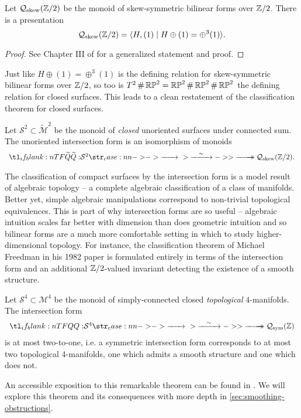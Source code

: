 \begin{proposition}
	Let $\mathcal{Q}_{\mathrm{skew}}(\mathbb{Z}/2)$ be the monoid of skew-symmetric bilinear forms over $\mathbb{Z}/2$. There is a presentation
	\[\mathcal{Q}_{\mathrm{skew}}(\mathbb{Z}/2) = \langle H, (1) \mid H\oplus (1) = \oplus^3 (1)\rangle.\]
\end{proposition}
\begin{proof}
	See Chapter III of \cite{milnorhuse1973forms} for a generalized statement and proof.
\end{proof}

Just like $H\oplus (1)= \oplus^3 (1)$ is the defining relation for skew-symmetric bilinear forms over $\mathbb{Z}/2$, so too is $T^2\+ \RP^2 = \RP^2\+\RP^2\+\RP^2$ the defining relation for closed surfaces. This leads to a clean restatement of the classification theorem for closed surfaces.

\begin{theorem}
	Let $\mathcal{S}^2\subset \widetilde{\mathcal{M}}^2$ be the monoid of \textit{closed} unoriented surfaces under connected sum. The unoriented intersection form is an isomorphism of monoids
	\[
		\lkxfunc{\widetilde{Q}}{\mathcal{S}^2}{\mathcal{Q}_{\mathrm{skew}}(\Z/2).}
	\]
\end{theorem}

The classification of compact surfaces by the intersection form is a model result of algebraic topology -- a complete algebraic classification of a class of manifolds. Better yet, simple algebraic manipulations correspond to non-trivial topological equivalences. This is part of why intersection forms are so useful -- algebraic intuition scales far better with dimension than does geometric intuition and so bilinear forms are a much more comfortable setting in which to study higher-dimensional topology. For instance, the classification theorem of Michael Freedman in his 1982 paper \cite{freedman1982manifold} is formulated entirely in terms of the intersection form and an additional $\mathbb{Z}/2$-valued invariant detecting the existence of a smooth structure.

\begin{theorem}[Freedman, 1982] Let $\mathcal{S}^4\subset \mathcal{M}^4$ be the monoid of simply-connected closed \emph{topological} $4$-manifolds. The intersection form
	\[
		\lkxfunc{Q}{\mathcal{S}^4}{\mathcal{Q}_{\mathrm{sym}}(\Z)}
	\]
	is at most two-to-one, i.e. a symmetric intersection form corresponds to at most two topological $4$-manifolds, one which admits a smooth structure and one which does not.
\end{theorem}
An accessible exposition to this remarkable theorem can be found in \cite{behrens2021discembedding}. We will explore this theorem and its consequences with more depth in \cref{sec:smoothing-obstructions}.

